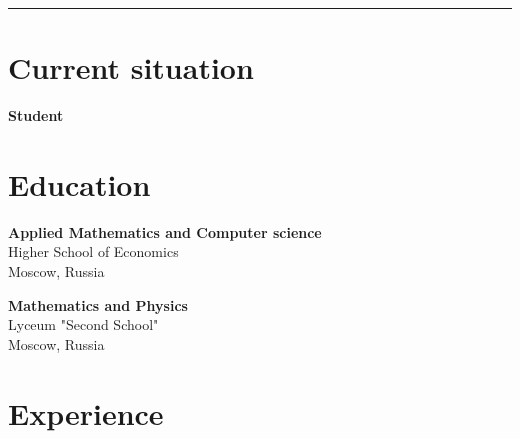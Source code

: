 \documentclass[a4paper,10pt]{article}
\newcommand{\MyVerticalRule}{%
	\textcolor{ColorOne}{\rule{1pt}{\textheight}}
}
\begin{document}
%
%
%
\hfill
\begin{adjustbox}{valign=t}
\begin{minipage}{0.05\textwidth}
\MyVerticalRule
\end{minipage}
\end{adjustbox}
\hfill
%
\begin{adjustbox}{valign=t}
\begin{minipage}{0.6\textwidth}
\section*{Current situation}
\begin{description}
\raggedright
\item[\normalfont \textcolor{ColorOne}{2020-now}] \textbf{Student}\\ \medskip

\end{description}

\section*{Education}
	\begin{description}
	\raggedright
	\item [\normalfont \textcolor{ColorOne}{2020-now}] \textbf{Applied Mathematics and Computer science}\\
	Higher School of Economics\\
	Moscow, Russia

	\item [\normalfont \textcolor{ColorOne}{2015-2020}] \textbf{Mathematics and Physics}\\
	Lyceum "Second School"\\
	Moscow, Russia
\end{description}

\section*{Experience}
\begin{description}
\raggedright
\item[\normalfont \textcolor{ColorOne}{No experience!}] 


\end{description}
\end{minipage}
\end{adjustbox}
\end{document}
